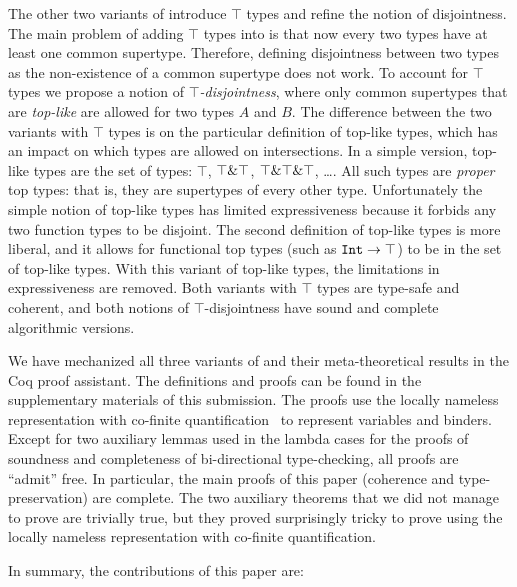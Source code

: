 The other two variants of \name introduce $\top$ types and refine the
notion of disjointness. The main problem of adding $\top$ types into
\name is that now every two types have at least one common supertype.
Therefore, defining disjointness between two types as the
non-existence of a common supertype does not work.  To account for
$\top$ types we propose a notion of \emph{$\top$-disjointness}, where
only common supertypes that are \emph{top-like} are allowed for two
types $A$ and $B$. The difference between the two variants with $\top$
types is on the particular definition of top-like types,
which has an impact on which types are allowed on intersections.
In a simple version, top-like types are the set of types: $\top$, 
$\top\&\top$, $\top\&\top\&\top$, \ldots. All such types
are \emph{proper} top types: that is, they are supertypes of every
other type. Unfortunately the simple notion of top-like types 
has limited expressiveness because it forbids any two function types 
to be disjoint. The second definition of top-like types 
is more liberal, and it allows for functional top types (such as 
$\texttt{Int}\to\texttt{$\top$}$) to be in the set of top-like types. With 
this variant of top-like types, the limitations in expressiveness are
removed. Both variants with $\top$ types are type-safe and coherent, 
and both notions of $\top$-disjointness have sound and complete
algorithmic versions.

We have mechanized all three variants of \name and their
meta-theoretical results in the Coq proof assistant. The definitions
and proofs can be found in the supplementary materials of this
submission. The proofs use the locally nameless representation with
co-finite quantification~\cite{aydemir-popl-08} to represent variables and
binders. Except for two auxiliary lemmas used in the lambda cases for
the proofs of soundness and completeness of bi-directional
type-checking, all proofs are ``admit'' free. In particular,
the main proofs of this paper (coherence and type-preservation) are
complete.  The two auxiliary theorems that we did not manage to prove
are trivially true, but they proved surprisingly tricky to prove using
the locally nameless representation with co-finite quantification.

In summary, the contributions of this paper are:

